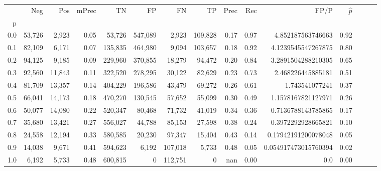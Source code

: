 \begin{tabular}{rrrrrrrrrrrrrrr}
\toprule
{} &     Neg &     Pos & mPrec &       TN &       FP &       FN &       TP &  Prec &   Rec &                  FP/P & $\hat{p}$ \\
p   &         &         &       &          &          &          &          &       &       &                       &           \\
\midrule
0.0 &  53,726 &   2,923 &  0.05 &   53,726 &  547,089 &    2,923 &  109,828 &  0.17 &  0.97 &     4.852187563746663 &      0.92 \\
0.1 &  82,109 &   6,171 &  0.07 &  135,835 &  464,980 &    9,094 &  103,657 &  0.18 &  0.92 &    4.1239545547267875 &      0.80 \\
0.2 &  94,125 &   9,185 &  0.09 &  229,960 &  370,855 &   18,279 &   94,472 &  0.20 &  0.84 &    3.2891504288210305 &      0.65 \\
0.3 &  92,560 &  11,843 &  0.11 &  322,520 &  278,295 &   30,122 &   82,629 &  0.23 &  0.73 &     2.468226445885181 &      0.51 \\
0.4 &  81,709 &  13,357 &  0.14 &  404,229 &  196,586 &   43,479 &   69,272 &  0.26 &  0.61 &        1.743541077241 &      0.37 \\
0.5 &  66,041 &  14,173 &  0.18 &  470,270 &  130,545 &   57,652 &   55,099 &  0.30 &  0.49 &    1.1578167821127971 &      0.26 \\
0.6 &  50,077 &  14,080 &  0.22 &  520,347 &   80,468 &   71,732 &   41,019 &  0.34 &  0.36 &    0.7136788143785865 &      0.17 \\
0.7 &  35,680 &  13,421 &  0.27 &  556,027 &   44,788 &   85,153 &   27,598 &  0.38 &  0.24 &    0.3972292928665821 &      0.10 \\
0.8 &  24,558 &  12,194 &  0.33 &  580,585 &   20,230 &   97,347 &   15,404 &  0.43 &  0.14 &   0.17942191200078048 &      0.05 \\
0.9 &  14,038 &   9,671 &  0.41 &  594,623 &    6,192 &  107,018 &    5,733 &  0.48 &  0.05 &  0.054917473015760394 &      0.02 \\
1.0 &   6,192 &   5,733 &  0.48 &  600,815 &        0 &  112,751 &        0 &   nan &  0.00 &                   0.0 &      0.00 \\
\bottomrule
\end{tabular}
